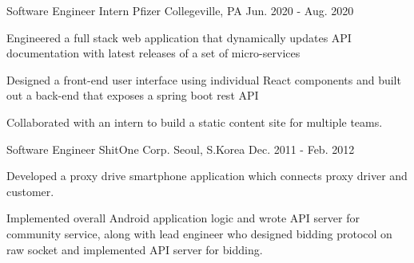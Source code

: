 \begin{cventries}
  \cventry
    {Software Engineer Intern} %
    {Pfizer} %
    {Collegeville, PA} %
    {Jun. 2020 - Aug. 2020} %
    {
      \begin{cvitems} %
        \item {Engineered a full stack web application that dynamically updates API documentation with latest releases of a set of micro-services}
        \item {Designed a front-end user interface using individual React components and built out a back-end that exposes a spring boot rest API}
        \item {Collaborated with an intern to build a static content site for multiple teams.}
      \end{cvitems}
    }

  \cventry
    {Software Engineer} %
    {ShitOne Corp.} %
    {Seoul, S.Korea} %
    {Dec. 2011 - Feb. 2012} %
    {
      \begin{cvitems} %
        \item {Developed a proxy drive smartphone application which connects proxy driver and customer.}
        \item {Implemented overall Android application logic and wrote API server for community service, along with lead engineer who designed bidding protocol on raw socket and implemented API server for bidding.}
      \end{cvitems}
    }

\end{cventries}
